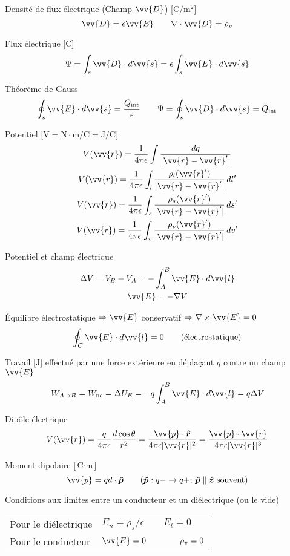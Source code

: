 \documentclass[10pt,landscape]{article}
\newcommand{\halfline}{\vspace{0.5em}}
\newcommand{\tableindent}{\hspace{1.5em}}
\newcommand{\uvec}[1]{\ensuremath{\boldsymbol{\hat{#1}}}}
\begin{document}
\begin{multicols}{3}
Densité de flux électrique (Champ $\vv{D}$)  [$\si{\coulomb/\metre^2}$]
\[ \vv{D} = \epsilon\vv{E}
\qquad \nabla \cdot \vv{D} = \rho_v \]

Flux électrique [\si{\coulomb}]
\[  \Psi = \int_{s} \vv{D} \cdot d\vv{s} = \epsilon \int_{s} \vv{E} \cdot d\vv{s} \]

Théorème de Gauss
\[ \oint_s \vv{E}\cdot d\vv{s} = \frac{Q_\text{int}}{\epsilon}
\qquad  \Psi = \oint_s \vv{D}\cdot d\vv{s} = Q_\text{int} \]

Potentiel [$\si{\volt} = \si{\newton\cdot\metre/\coulomb} = \si{\joule/\coulomb}$]
\begin{gather*}
V(\vv{r}) = \frac{1}{4\pi\epsilon} \int \frac{dq}{| \vv{r} - \vv{r}' | }  \\
V(\vv{r}) = \frac{1}{4\pi\epsilon} \int_{l} \frac{\rho_l(\vv{r}')}{| \vv{r} - \vv{r}' | } \,dl'  \\
V(\vv{r}) = \frac{1}{4\pi\epsilon} \int_{s} \frac{\rho_s(\vv{r}')}{| \vv{r} - \vv{r}'| } \,ds'  \\
V(\vv{r}) = \frac{1}{4\pi\epsilon} \int_{v} \frac{\rho_v(\vv{r}')}{| \vv{r} - \vv{r}' | } \,dv'  
\end{gather*}

Potentiel et champ électrique
\begin{gather*}
\Delta V = V_B - V_A  = -\int_A^B \vv{E}\cdot d\vv{l} \\
 \vv{E} = -\nabla V
\end{gather*}

Équilibre électrostatique $\Rightarrow \vv{E}$ conservatif  $\Rightarrow \nabla \times \vv{E} = 0$
\[  \oint_C \vv{E}\cdot d\vv{l}  = 0 \qquad \text{(électrostatique)}\]

Travail [\si{\joule}] effectué par une force extérieure en déplaçant $q$ contre un champ $\vv{E}$
\[ W_{A\to B} = W_\text{nc} = \Delta U_E = -q\int_{A}^{B} \vv{E}\cdot d\vv{l} = q\Delta V \]

Dipôle électrique
\[ V(\vv{r}) = \frac{q}{4\pi\epsilon} \frac{d\cos\theta}{r^2} =
\frac{\vv{p}\cdot\uvec{r}}{4\pi\epsilon|\vv{r}|^2} =
\frac{\vv{p}\cdot\vv{r}}{4\pi\epsilon|\vv{r}|^3} \]

Moment dipolaire [$\si{\coulomb\cdot\meter}$]
\[ \vv{p} = qd\cdot \uvec{p} \qquad \text{($\uvec{p}: q- \to q+$;  $\uvec{p}\parallel\uvec{z}$ souvent)} \]

\halfline
Conditions aux limites entre un conducteur et un diélectrique  (ou le vide)\\
\halfline
\begin{tabular}{@{\tableindent}ll@{}}
	Pour le diélectrique & $ E_n = {\rho_s}/{\epsilon} \qquad E_t = 0 $ \\
	Pour le conducteur  & $\vv{E} = 0 \qquad\qquad \rho_v = 0 $ \\
\end{tabular}


\end{multicols}
\end{document}

